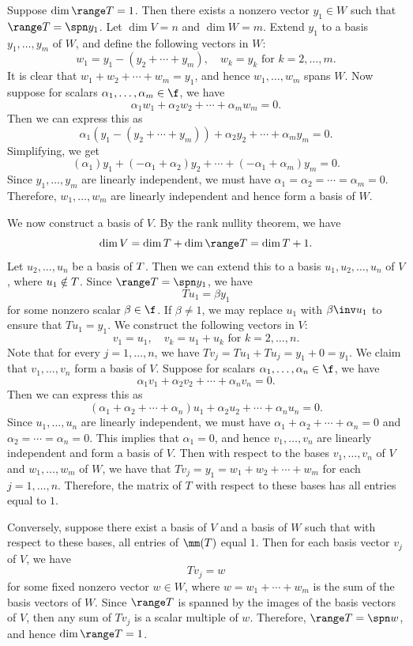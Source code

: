 \begin{sol}
    Suppose $\dim \range T = 1$. Then there exists a nonzero vector $y_1 \in W$ such that $\range T = \spn y_1$. Let $\dim V = n$ and $\dim W = m$. Extend $y_1$ to a basis $y_1, \ldots, y_m$ of $W$, and define the following vectors in $W$:
    \[w_1 = y_1 - (y_2 + \cdots + y_m), \quad w_k = y_k \text{ for } k = 2, \ldots, m.\]
    It is clear that $w_1 + w_2 + \cdots + w_m = y_1$, and hence $w_1, \ldots, w_m$ spans $W$. Now suppose for scalars $\alpha_1, \ldots, \alpha_m \in \f$, we have
    \[\alpha_1 w_1 + \alpha_2 w_2 + \cdots + \alpha_m w_m = 0.\]
    Then we can express this as
    \[\alpha_1(y_1 - (y_2 + \cdots + y_m)) + \alpha_2 y_2 + \cdots + \alpha_m y_m = 0.\]
    Simplifying, we get
    \[(\alpha_1) y_1 + (-\alpha_1 + \alpha_2) y_2 + \cdots + (-\alpha_1 + \alpha_m) y_m = 0.\]
    Since $y_1, \ldots, y_m$ are linearly independent, we must have $\alpha_1 = \alpha_2 = \cdots = \alpha_m = 0$. Therefore, $w_1, \ldots, w_m$ are linearly independent and hence form a basis of $W$.

    We now construct a basis of $V$. By the rank nullity theorem, we have
    \[\dim V = \dim \null T + \dim \range T = \dim \null T + 1.\]
    Let $u_2, \ldots, u_n$ be a basis of $\null T$. Then we can extend this to a basis $u_1, u_2, \ldots, u_n$ of $V$, where $u_1 \notin \null T$. Since $\range T = \spn y_1$, we have
    \[Tu_1 = \beta y_1\]
    for some nonzero scalar $\beta \in \f$. If $\beta \neq 1$, we may replace $u_1$ with $\beta\inv u_1$ to ensure that $Tu_1 = y_1$. We construct the following vectors in $V$:
    \[v_1 = u_1, \quad v_k = u_1 + u_k \text{ for } k = 2, \ldots, n.\]
    Note that for every $j = 1, \ldots, n$, we have $Tv_j = Tu_1 + Tu_j = y_1 + 0 = y_1$. We claim that $v_1, \ldots, v_n$ form a basis of $V$. Suppose for scalars $\alpha_1, \ldots, \alpha_n \in \f$, we have
    \[\alpha_1 v_1 + \alpha_2 v_2 + \cdots + \alpha_n v_n = 0.\]
    Then we can express this as
    \[(\alpha_1 + \alpha_2 + \cdots + \alpha_n) u_1 + \alpha_2 u_2 + \cdots + \alpha_n u_n = 0.\]
    Since $u_1, \ldots, u_n$ are linearly independent, we must have $\alpha_1 + \alpha_2 + \cdots + \alpha_n = 0$ and $\alpha_2 = \cdots = \alpha_n = 0$. This implies that $\alpha_1 = 0$, and hence $v_1, \ldots, v_n$ are linearly independent and form a basis of $V$. Then with respect to the bases $v_1, \ldots, v_n$ of $V$ and $w_1, \ldots, w_m$ of $W$, we have that $Tv_j = y_1 = w_1 + w_2 + \cdots + w_m$ for each $j = 1, \ldots, n$. Therefore, the matrix of $T$ with respect to these bases has all entries equal to $1$.

    Conversely, suppose there exist a basis of $V$ and a basis of $W$ such that with respect to these bases, all entries of $\mm(T)$ equal $1$. Then for each basis vector $v_j$ of $V$, we have
    \[Tv_j = w\]
    for some fixed nonzero vector $w \in W$, where $w = w_1 + \cdots + w_m$ is the sum of the basis vectors of $W$. Since $\range T$ is spanned by the images of the basis vectors of $V$, then any sum of $Tv_j$ is a scalar multiple of $w$. Therefore, $\range T = \spn w$, and hence $\dim \range T = 1$.
\end{sol}

